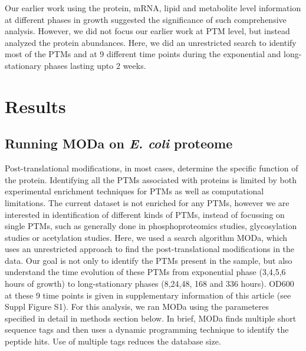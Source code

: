 \documentclass[12pt]{article}
\begin{document}
Our earlier work using the protein, mRNA, lipid and metabolite level information at different phases in growth suggested the significance of such comprehensive analysis. However, we did not focus our earlier work at PTM level, but instead analyzed the protein abundances. Here, we did an unrestricted search to identify most of the PTMs and at 9 different time points during the exponential and long-stationary phases lasting upto 2 weeks.

\section{Results}

\subsection{Running MODa on \emph{E. coli} proteome}
Post-translational modifications, in most cases, determine the specific function of the protein. Identifying all the PTMs associated with proteins is limited by both experimental enrichment techniques for PTMs as well as computational limitations. The current dataset is not enriched for any PTMs, however we are interested in identification of different kinds of PTMs, instead of focussing on single PTMs, such as generally done in phosphoproteomics studies, glycosylation studies or acetylation studies. Here, we used a search algorithm MODa, which uses an unrestricted approach to find the post-translational modifications in the data. Our goal is not only to identify the PTMs present in the sample, but also understand the time evolution of these PTMs from exponential phase (3,4,5,6 hours of growth) to long-stationary phases (8,24,48, 168 and 336 hours). OD600 at these 9 time points is given in supplementary information of this article (see Suppl Figure S1). For this analysis, we ran MODa using the parameteres specified in detail in methods section below. In brief, MODa finds multiple short sequence tags and then uses a dynamic programming technique to identify the peptide hits. Use of multiple tags reduces the database size. 

\end{document}
